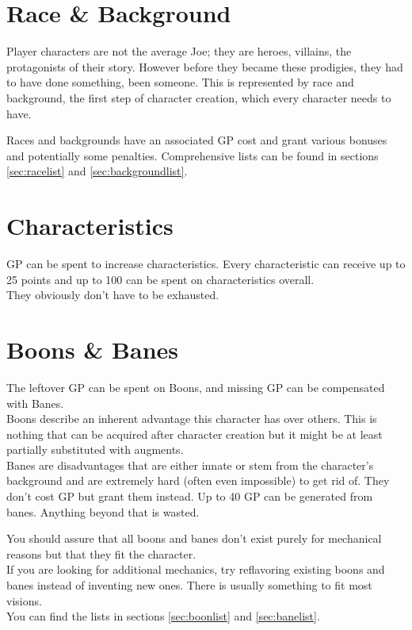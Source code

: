 \documentclass[12pt,a4paper,openany,dvipsnames]{book}
\begin{document}
	\begin{multicols}{2}
	\begin{enumerate}
	\end{enumerate}
	\end{multicols}

	\section{Race \& Background}
	Player characters are not the average Joe; they are heroes, villains, the protagonists of their story. However before they became these prodigies, they had to have done something, been someone. This is represented by race and background, the first step of character creation, which every character needs to have.\par
	Races and backgrounds have an associated GP cost and grant various bonuses and potentially some penalties. Comprehensive lists can be found in sections \ref{sec:racelist} and \ref{sec:backgroundlist}.
	\section{Characteristics}
	GP can be spent to increase characteristics. Every characteristic can receive up to 25 points and up to 100 can be spent on characteristics overall.\\
	They obviously don’t have to be exhausted.
	\section{Boons \& Banes}
	The leftover GP can be spent on Boons, and missing GP can be compensated with Banes.\\
	Boons describe an inherent advantage this character has over others. This is nothing that can be acquired after character creation but it might be at least partially substituted with augments.\\
	Banes are disadvantages that are either innate or stem from the character’s background and are extremely hard (often even impossible) to get rid of.
	They don’t cost GP but grant them instead.
	Up to 40 GP can be generated from banes.
	Anything beyond that is wasted.
	\par
	You should assure that all boons and banes don’t exist purely for mechanical reasons but that they fit the character.\\
	If you are looking for additional mechanics, try reflavoring existing boons and banes instead of inventing new ones. There is usually something to fit most visions.\\
	You can find the lists in sections \ref{sec:boonlist} and \ref{sec:banelist}.
\end{document}
